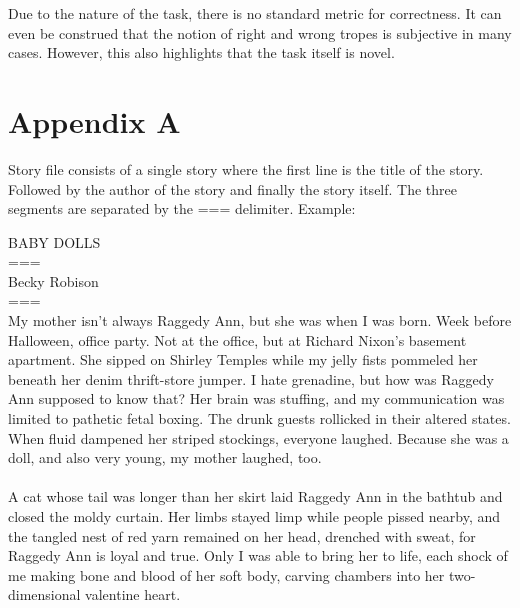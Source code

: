 \documentclass[11pt]{article}
\begin{document}
Due to the nature of the task, there is no standard metric for correctness. It can even be construed that the notion of right and wrong tropes is subjective in  many cases. However, this also highlights that the task itself is novel.

\printbibliography
\clearpage
\appendix
\section{Appendix A}
\label{appendix:a}
Story file consists of a single story where the first line is the title of the story. Followed by the author of the story and finally the story itself. The three segments are separated by the === delimiter. Example: 

\noindent BABY DOLLS\\
===\\
Becky Robison\\
===\\
My mother isn’t always Raggedy Ann, but she was when I was born. Week before Halloween, office party. Not at the office, but at Richard Nixon’s basement apartment. She sipped on Shirley Temples while my jelly fists pommeled her beneath her denim thrift-store jumper. I hate grenadine, but how was Raggedy Ann supposed to know that? Her brain was stuffing, and my communication was limited to pathetic fetal boxing. The drunk guests rollicked in their altered states. When fluid dampened her striped stockings, everyone laughed. Because she was a doll, and also very young, my mother laughed, too.\\
\\
A cat whose tail was longer than her skirt laid Raggedy Ann in the bathtub and closed the moldy curtain. Her limbs stayed limp while people pissed nearby, and the tangled nest of red yarn remained on her head, drenched with sweat, for Raggedy Ann is loyal and true. Only I was able to bring her to life, each shock of me making bone and blood of her soft body, carving chambers into her two-dimensional valentine heart.
\end{document}
